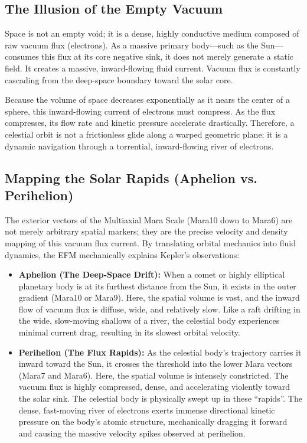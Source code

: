 \documentclass[11pt, a4paper]{article}
\begin{document}
\subsection{The Illusion of the Empty Vacuum}
Space is not an empty void; it is a dense, highly conductive medium composed of raw vacuum flux (electrons). As a massive primary body—such as the Sun—consumes this flux at its core negative sink, it does not merely generate a static field. It creates a massive, inward-flowing fluid current. Vacuum flux is constantly cascading from the deep-space boundary toward the solar core. 

Because the volume of space decreases exponentially as it nears the center of a sphere, this inward-flowing current of electrons must compress. As the flux compresses, its flow rate and kinetic pressure accelerate drastically. Therefore, a celestial orbit is not a frictionless glide along a warped geometric plane; it is a dynamic navigation through a torrential, inward-flowing river of electrons.

\subsection{Mapping the Solar Rapids (Aphelion vs. Perihelion)}
The exterior vectors of the Multiaxial Mara Scale (Mara10 down to Mara6) are not merely arbitrary spatial markers; they are the precise velocity and density mapping of this vacuum flux current. By translating orbital mechanics into fluid dynamics, the EFM mechanically explains Kepler's observations:

\begin{itemize}
  \item \textbf{Aphelion (The Deep-Space Drift):} When a comet or highly elliptical planetary body is at its furthest distance from the Sun, it exists in the outer gradient (Mara10 or Mara9). Here, the spatial volume is vast, and the inward flow of vacuum flux is diffuse, wide, and relatively slow. Like a raft drifting in the wide, slow-moving shallows of a river, the celestial body experiences minimal current drag, resulting in its slowest orbital velocity.
  
  \item \textbf{Perihelion (The Flux Rapids):} As the celestial body's trajectory carries it inward toward the Sun, it crosses the threshold into the lower Mara vectors (Mara7 and Mara6). Here, the spatial volume is intensely constricted. The vacuum flux is highly compressed, dense, and accelerating violently toward the solar sink. The celestial body is physically swept up in these ``rapids''. The dense, fast-moving river of electrons exerts immense directional kinetic pressure on the body's atomic structure, mechanically dragging it forward and causing the massive velocity spikes observed at perihelion.
\end{itemize}
\end{document}
